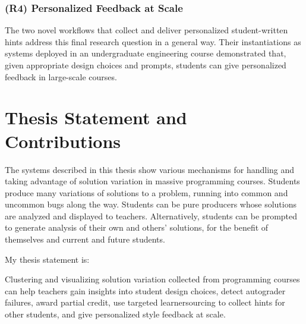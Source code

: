\subsubsection{(R4) Personalized Feedback at Scale}
The two novel workflows that collect and deliver personalized student-written hints address this final research question in a general way. Their instantiations as systems deployed in an undergraduate engineering course demonstrated that, given appropriate design choices and prompts, students can give personalized feedback in large-scale courses.





\section{Thesis Statement and Contributions}

The systems described in this thesis show various mechanisms for handling and taking advantage of solution variation in massive programming courses. Students produce many variations of solutions to a problem, running into common and uncommon bugs along the way. Students can be pure producers whose solutions are analyzed and displayed to teachers. Alternatively, students can be prompted to generate analysis of their own and others' solutions, for the benefit of themselves and current and future students. %

My thesis statement is: 
\begin{displayquote}
Clustering and visualizing solution variation collected from programming courses can help teachers gain insights into student design choices, detect autograder failures, award partial credit, use targeted learnersourcing to collect hints for other students, and give personalized style feedback at scale.
\end{displayquote}

